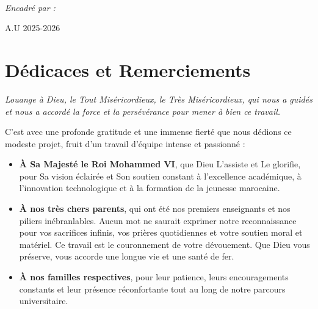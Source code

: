 \documentclass[1pt,a4paper]{report}
\begin{document}
\begin{titlepage}
\begin{center}
\begin{minipage}{0.45\textwidth}
\begin{center}
    \end{center}
\end{minipage}
\\

\begin{center}
    \large \emph{Encadré par :}\\
    \vspace{0.2cm}
\end{center}




\vfill

{A.U 2025-2026}

\end{center}
\end{titlepage}





\chapter*{Dédicaces et Remerciements}

\begin{center}
\textit{Louange à Dieu, le Tout Miséricordieux, le Très Miséricordieux, qui nous a guidés et nous a accordé la force et la persévérance pour mener à bien ce travail.}
\end{center}

\vspace{0.4cm}

\noindent C'est avec une profonde gratitude et une immense fierté que nous dédions ce modeste projet, fruit d'un travail d'équipe intense et passionné :

\begin{itemize}
    \item \textbf{À Sa Majesté le Roi Mohammed VI}, que Dieu L'assiste et Le glorifie, pour Sa vision éclairée et Son soutien constant à l'excellence académique, à l'innovation technologique et à la formation de la jeunesse marocaine.
    \item \textbf{À nos très chers parents}, qui ont été nos premiers enseignants et nos piliers inébranlables. Aucun mot ne saurait exprimer notre reconnaissance pour vos sacrifices infinis, vos prières quotidiennes et votre soutien moral et matériel. Ce travail est le couronnement de votre dévouement. Que Dieu vous préserve, vous accorde une longue vie et une santé de fer.
    \item \textbf{À nos familles respectives}, pour leur patience, leurs encouragements constants et leur présence réconfortante tout au long de notre parcours universitaire.
\end{itemize}
\end{document}
